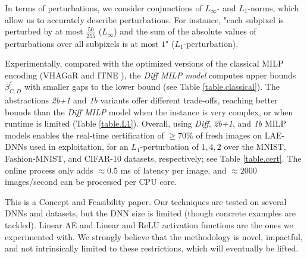 \begin{enumerate}

\end{enumerate}


In terms of perturbations, we consider conjunctions of $L_\infty$- and $L_1$-norms, which allow us to accurately describe perturbations. For instance, "each subpixel is perturbed by at most $\frac{50}{255}$ ($L_\infty$) and the sum of the absolute values of perturbations over all subpixels is at most $1$" ($L_1$-perturbation). 


Experimentally, 
compared with the optimized versions of the classical MILP encoding
(VHAGaR \citep{vhagar} and ITNE \citep{ITNE}),
the {\em Diff MILP model} computes upper bounds
$\bar{\beta}^{\varepsilon}_{C,D}$ with smaller gaps to the lower bound (see Table \ref{table.classical}). 
The abstractions {\em 2b+1} and {\em 1b} variants offer different trade-offs, reaching better bounds than the {\em Diff MILP} model when the instance is very complex, or when runtime is limited (Table \ref{table.L1}).  
Overall, using {\em Diff}, {\em 2b+1}, and {\em 1b}  MILP models 
enables the real-time certification of $\geq 70\%$ of fresh images 
on LAE-DNNs used in exploitation, for an $L_1$-perturbation of $1,4,2$ over the MNIST, Fashion-MNIST, and CIFAR-10 datasets, respectively; see Table \ref{table.cert}. The online process only adds  $\approx 0.5$ ms of latency per image, and $\approx 2000$ images/second can be processed per CPU core.

This is a Concept and Feasibility paper. 
Our techniques are tested on several DNNs and datasets, but the DNN size is limited (though concrete examples are tackled). 
Linear AE and Linear and ReLU activation functions are the ones we experimented with. We strongly believe that the methodology is novel, impactful, and not intrinsically limited to these restrictions, which will eventually be lifted.